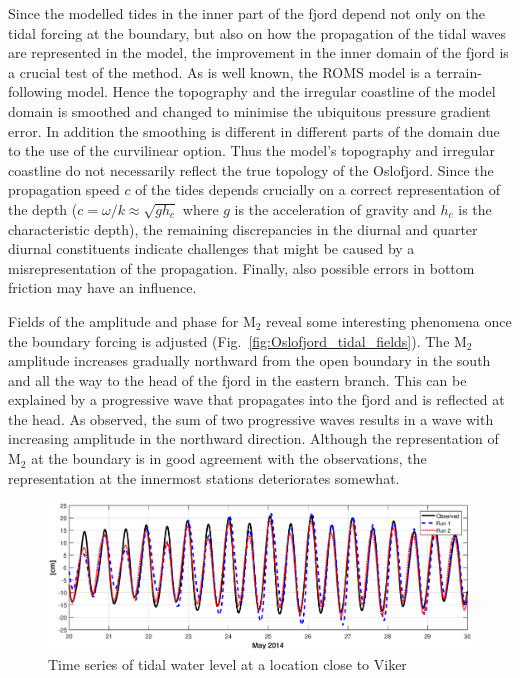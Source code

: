 Since the modelled tides in the inner part of the fjord depend not only on the tidal forcing at the boundary, but also on how the propagation of the tidal waves are represented in the model, the improvement in the inner domain of the fjord is a crucial test of the method. As is well known, the ROMS model is a terrain-following model. Hence the topography and the irregular coastline of the model domain is smoothed and changed to minimise the ubiquitous pressure gradient error. In addition the smoothing is different in different parts of the domain due to the use of the curvilinear option. Thus the model's topography and irregular coastline do not necessarily reflect the true topology of the Oslofjord. Since the propagation speed $c$ of the tides depends crucially on a correct representation of the depth ($c = \omega/k \approx \sqrt{g h_c}$ where $g$ is the acceleration of gravity and $h_c$ is the characteristic depth), the remaining  discrepancies in the diurnal and quarter diurnal constituents indicate challenges that might be caused by a misrepresentation of the propagation. Finally, also possible errors in bottom friction may have an influence.

Fields of the amplitude and phase for M$_2$ reveal some interesting phenomena once the boundary forcing is adjusted (Fig.~\ref{fig:Oslofjord_tidal_fields}). The M$_2$ amplitude increases gradually northward from the open boundary in the south and all the way to the head of the fjord in the eastern branch. This can be explained by a progressive wave that propagates into the fjord and is reflected at the head. As observed, the sum of two progressive waves results in a wave with increasing amplitude in the northward direction. Although the representation of M$_2$ at the boundary is in good agreement with the observations, the representation at the innermost stations deteriorates somewhat.


\begin{figure}[!t]
\centering
\includegraphics[width=\textwidth]{fig_Viker_timeseries}
\caption{Time series of tidal water level at a location close to Viker}
\label{fig:Viker_timeseries}
\end{figure}

